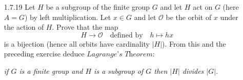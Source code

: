 \begin{enumerate}
      We can thus conclude that $\sim$ is an equivalence relation on $A$. \qed
   \item[1.7.19]  Let $H$ be a subgroup of the finite group $G$ and let $H$ act
                  on $G$ (here $A = G$) by left multiplication. Let $x \in G$
                  and let $\mathcal{O}$ be the orbit of $x$ under the action of
                  $H$. Prove that the map
                  $$H \rightarrow \mathcal{O}\quad \text{defined by} \quad
                    h \mapsto hx$$
                  is a bijection (hence all orbits have cardinality $|H|$). From
                  this and the preceding exercise deduce
                  $\textit{Lagrange's Theorem}:$
                  \begin{center}
                     \textit{if $G$ is a finite group and $H$ is a subgroup of
                     $G$ then $|H|$ divides $|G|$}.
                  \end{center}
                  

\end{enumerate}
